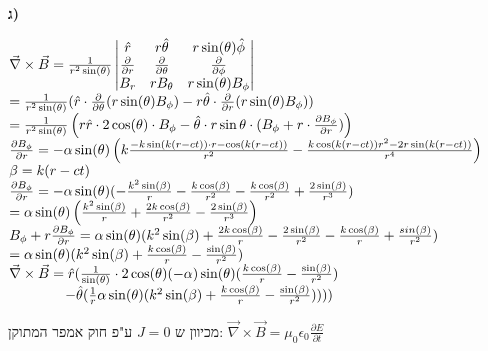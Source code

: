 \documentclass[14pt]{extarticle}
\makeatletter
\newenvironment{lefteqs}{%
    \begin{english}%
    \begin{flushleft}%
    \renewcommand{\arraystretch}{1.3}%
    $\begin{array}{@{}l@{}}%
}{%
    \end{array}$%
    \end{flushleft}%
    \end{english}%
}
\makeatother
\begin{document}
\textbf{ג)} 
\begin{lefteqs}
    \vec{\nabla} \times \vec{B} = \frac{1}{r^2 \sin(\theta)} \begin{vmatrix}
        \hat{r} & r\hat{\theta} & r\sin(\theta)\hat{\phi} \\
        \frac{\partial}{\partial r} & \frac{\partial}{\partial \theta} & \frac{\partial}{\partial \phi} \\
        B_r & rB_\theta & r\sin(\theta)B_\phi
    \end{vmatrix} \\
    = \frac{1}{r^2\sin(\theta)}(\hat{r} \cdot \frac{\partial}{\partial \theta}(r\sin(\theta)B_\phi) - r\hat{\theta} \cdot \frac{\partial}{\partial r}(r\sin(\theta)B_\phi)) \\
    = \frac{1}{r^2\sin(\theta)} \left( r\hat{r} \cdot 2\cos(\theta) \cdot B_\phi - \hat{\theta} \cdot r\sin{\theta} \cdot (B_\phi + r\cdot\frac{\partial B_\phi}{\partial r}) \right) \\
    \frac{\partial B_\phi}{\partial r} = -\alpha \sin(\theta) \left(k \frac{-k\sin(k(r-ct))\cdot r - \cos(k(r-ct))}{r^2} - \frac{k\cos(k(r-ct))r^2 - 2r\sin(k(r-ct))}{r^4} \right) \\
    \beta = k(r-ct) \\
    \frac{\partial B_\phi}{\partial r} = -\alpha \sin(\theta) ( -\frac{k^2\sin(\beta)}{r} - \frac{k\cos(\beta)}{r^2} - \frac{k\cos(\beta)}{r^2} + \frac{2\sin(\beta)}{r^3} ) \\
    = \alpha \sin(\theta) \left( \frac{k^2\sin(\beta)}{r} + \frac{2k\cos(\beta)}{r^2} - \frac{2\sin(\beta)}{r^3} \right) \\
    B_\phi + r\frac{\partial B_\phi}{\partial r} = \alpha \sin(\theta) (k^2 \sin(\beta) + \frac{2k\cos(\beta)}{r} - \frac{2\sin(\beta)}{r^2} - \frac{k\cos(\beta)}{r} + \frac{sin(\beta)}{r^2}) \\
    = \alpha \sin(\theta) (k^2 \sin(\beta) + \frac{k\cos(\beta)}{r} - \frac{\sin(\beta)}{r^2}) \\
    \vec{\nabla} \times \vec{B} = \hat{r} (\frac{1}{\sin(\theta)} \cdot 2\cos(\theta) (-\alpha) \sin(\theta)(\frac{k\cos(\beta)}{r} - \frac{\sin(\beta)}{r^2})  \\
    \qquad \qquad -\hat{\theta} (\frac{1}{r} \alpha \sin(\theta) (k^2 \sin(\beta) + \frac{k\cos(\beta)}{r} - \frac{\sin(\beta)}{r^2}))))
\end{lefteqs}

מכיוון ש $J=0$ ע"פ חוק אמפר המתוקן: $\vec{\nabla} \times \vec{B} = \mu_0 \epsilon_0 \frac{\partial E}{\partial t}$
\end{document}
